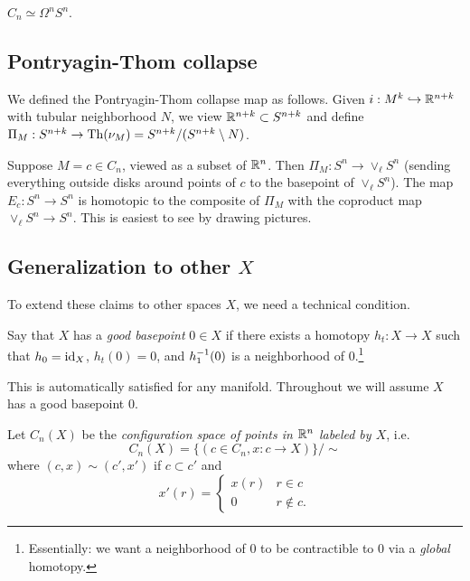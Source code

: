 \documentclass{article}
\begin{document}
\begin{cor}
	$C_n \simeq \Omega^n S^n$.
\end{cor}

\subsection{Pontryagin-Thom collapse}

We defined the Pontryagin-Thom collapse map as follows.
Given $i: M^k \hookrightarrow \mathbb{R}^{n+k}$ with tubular neighborhood $N$, we view $\mathbb{R}^{n+k} \subset S^{n+k}$ and define $\Pi_M: S^{n+k} \to \operatorname{Th}(\nu_M) = S^{n+k} / (S^{n+k} \setminus N)$.

\begin{ex}
	Suppose $M = c \in C_n$, viewed as a subset of $\mathbb{R}^n$.
	Then $\Pi_M: S^n \to \vee_\ell S^n$ (sending everything outside disks around points of $c$ to the basepoint of $\vee_\ell S^n$).
	The map $E_c: S^n \to S^n$ is homotopic to the composite of $\Pi_M$ with the coproduct map $\vee_\ell S^n \to S^n$.
	This is easiest to see by drawing pictures.
\end{ex}

\subsection{Generalization to other $X$}

To extend these claims to other spaces $X$, we need a technical condition.

\begin{dfn}
	Say that $X$ has a \emph{good basepoint} $0 \in X$ if there exists a homotopy $h_t: X \to X$ such that $h_0 = \operatorname{id}_X$, $h_t(0) = 0$, and $h_1^{-1}(0)$ is a neighborhood of $0$.\footnote{Essentially: we want a neighborhood of $0$ to be contractible to $0$ via a \emph{global} homotopy.}
\end{dfn}

This is automatically satisfied for any manifold.
Throughout we will assume $X$ has a good basepoint $0$.

\begin{dfn}
	Let $C_n(X)$ be the \emph{configuration space of points in $\mathbb{R}^n$ labeled by $X$}, i.e.\
	\[
		C_n(X) = \{ (c \in C_n, x: c \to X) \} / \sim
	\]
	where $(c, x) \sim (c', x')$ if $c \subset c'$ and
	\[
		x'(r) = \begin{cases}
			x(r) & r \in c \\
			0 & r \not\in c.
		\end{cases}
	\]
\end{dfn}
\end{document}
